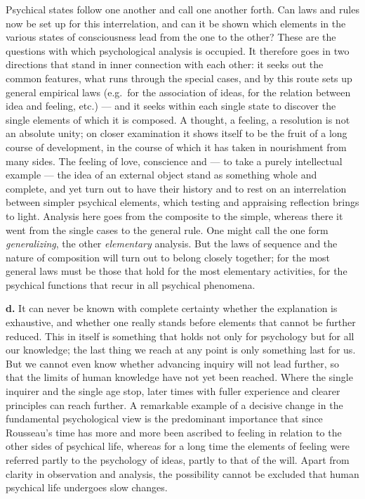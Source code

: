 \documentclass[12pt,a4paper]{book}
\newcommand{\opage}[1]{\marginnote{\footnotesize\textit{[#1]}}}
\begin{document}
Psychical states follow one another and call one another forth. Can
laws and rules now be set up for this interrelation, and can it be shown
which elements in the various states of consciousness lead from the one
to the other? These are the questions with which psychological analysis
is occupied. It therefore goes in two directions that stand in inner
connection with each other: it seeks out the common features, what runs
through the special cases, and by this route sets up general empirical
laws (e.g.\ for the association of ideas, for the relation between idea
and feeling, etc.) --- and it seeks within each single state to discover
the single elements of which it is composed. A thought, a feeling, a
resolution is not an absolute unity; on closer examination it shows
itself to be the fruit of a long course of development, in the course of
which it has taken in nourishment from many sides. The feeling of love,
conscience and --- to take a purely intellectual example --- the idea of
an external object stand as something whole and complete,
\opage{24}and yet turn out to have their history and to rest on an
interrelation between simpler psychical elements, which testing and
appraising reflection brings to light. Analysis here goes from the
composite to the simple, whereas there it went from the single cases to
the general rule. One might call the one form \emph{generalizing}, the
other \emph{elementary} analysis. But the laws of sequence and the
nature of composition will turn out to belong closely together; for the
most general laws must be those that hold for the most elementary
activities, for the psychical functions that recur in all psychical
phenomena.

\textbf{d.} It can never be known with complete certainty whether the
explanation is exhaustive, and whether one really stands before elements
that cannot be further reduced. This in itself is something that holds
not only for psychology but for all our knowledge; the last thing we
reach at any point is only something last for us. But we cannot even
know whether advancing inquiry will not lead further, so that the limits
of human knowledge have not yet been reached. Where the single inquirer
and the single age stop, later times with fuller experience and clearer
principles can reach further. A remarkable example of a decisive change
in the fundamental psychological view is the predominant importance that
since Rousseau's time has more and more been ascribed to feeling in
relation to the other sides of psychical life, whereas for a long time
the elements of feeling were referred partly to the psychology of ideas,
partly to that of the will. Apart from clarity in observation and
analysis, the possibility cannot be excluded that human psychical life
undergoes slow changes.
\end{document}
